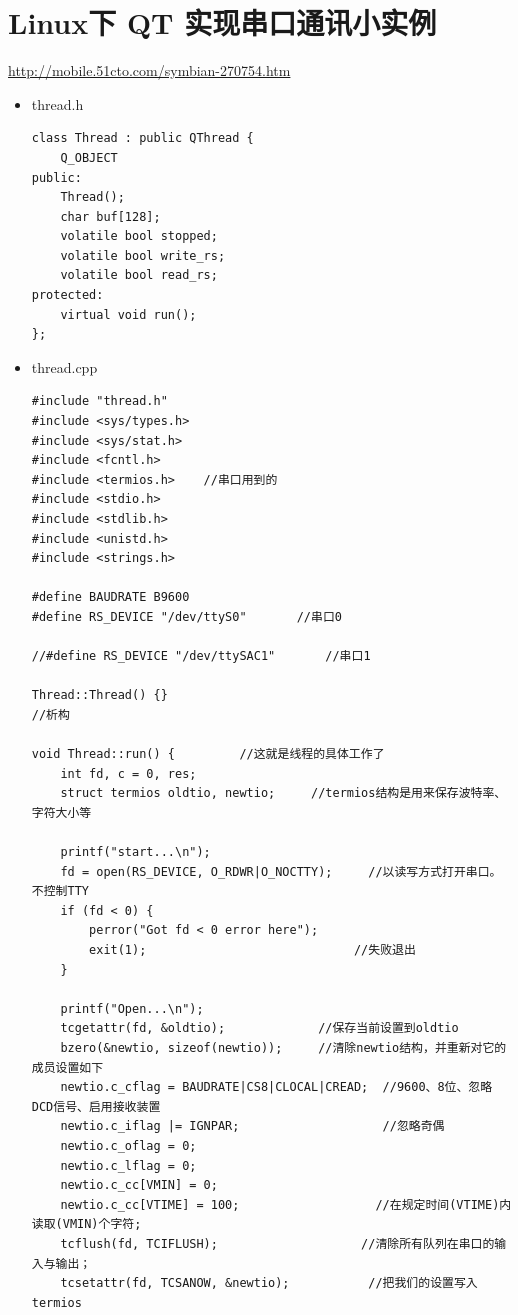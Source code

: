 \documentclass[9pt,b5paper]{article}
\begin{document}
\section{Linux下 QT 实现串口通讯小实例}
\label{sec-7}
\url{http://mobile.51cto.com/symbian-270754.htm}
\begin{itemize}
\item thread.h

\lstset{language=java,label= ,caption= ,numbers=none}
\begin{lstlisting}
class Thread : public QThread {     
    Q_OBJECT     
public:     
    Thread();     
    char buf[128];     
    volatile bool stopped;     
    volatile bool write_rs;     
    volatile bool read_rs;     
protected:     
    virtual void run();     
};
\end{lstlisting}
\item thread.cpp

\lstset{language=java,label= ,caption= ,numbers=none}
\begin{lstlisting}
#include "thread.h"     
#include <sys/types.h>     
#include <sys/stat.h>     
#include <fcntl.h>     
#include <termios.h>    //串口用到的     
#include <stdio.h>     
#include <stdlib.h>     
#include <unistd.h>     
#include <strings.h>     

#define BAUDRATE B9600     
#define RS_DEVICE "/dev/ttyS0"       //串口0     

//#define RS_DEVICE "/dev/ttySAC1"       //串口1     

Thread::Thread() {}                                                 //析构     

void Thread::run() {         //这就是线程的具体工作了     
    int fd, c = 0, res;     
    struct termios oldtio, newtio;     //termios结构是用来保存波特率、字符大小等     

    printf("start...\n");     
    fd = open(RS_DEVICE, O_RDWR|O_NOCTTY);     //以读写方式打开串口。不控制TTY     
    if (fd < 0) {         
        perror("Got fd < 0 error here");     
        exit(1);                             //失败退出     
    }
    
    printf("Open...\n");     
    tcgetattr(fd, &oldtio);             //保存当前设置到oldtio     
    bzero(&newtio, sizeof(newtio));     //清除newtio结构，并重新对它的成员设置如下    
    newtio.c_cflag = BAUDRATE|CS8|CLOCAL|CREAD;  //9600、8位、忽略DCD信号、启用接收装置     
    newtio.c_iflag |= IGNPAR;                    //忽略奇偶     
    newtio.c_oflag = 0;     
    newtio.c_lflag = 0;     
    newtio.c_cc[VMIN] = 0;     
    newtio.c_cc[VTIME] = 100;                   //在规定时间(VTIME)内读取(VMIN)个字符;     
    tcflush(fd, TCIFLUSH);                    //清除所有队列在串口的输入与输出；     
    tcsetattr(fd, TCSANOW, &newtio);           //把我们的设置写入termios
    

\end{lstlisting}
\end{itemize}
\end{document}
